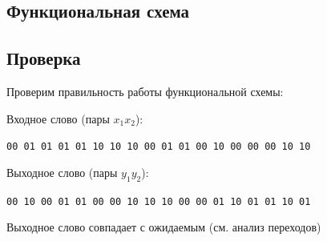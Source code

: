 \documentclass[listings]{labreport}
\begin{document}
\subsection*{Функциональная схема}

\subsection*{Проверка}

Проверим правильность работы функциональной схемы:

Входное слово (пары $x_1x_2$):

\verb|00 01 01 01 01 10 10 10 00 01 01 00 10 00 00 00 10 10|

Выходное слово (пары $y_1y_2$):

\verb|00 10 00 01 01 00 00 10 10 10 00 00 01 10 01 01 10 01|

Выходное слово совпадает с ожидаемым (см. анализ переходов)
\end{document}
